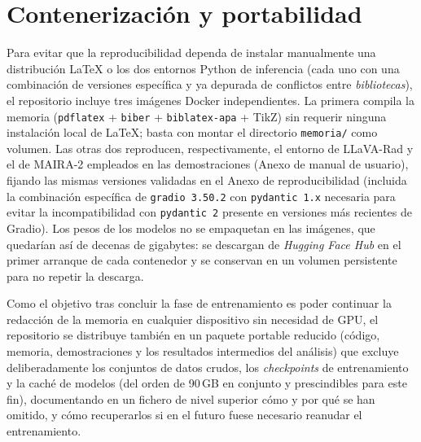 \documentclass[12pt,a4paper]{report}
\begin{document}
\section{Contenerización y portabilidad}
Para evitar que la reproducibilidad dependa de instalar manualmente una distribución LaTeX o los dos
entornos Python de inferencia (cada uno con una combinación de versiones específica y ya
depurada de conflictos entre \textit{bibliotecas}), el repositorio incluye tres imágenes
Docker independientes. La primera compila la memoria (\texttt{pdflatex} + \texttt{biber} +
\texttt{biblatex-apa} + TikZ) sin requerir ninguna instalación local de LaTeX; basta con montar el
directorio \texttt{memoria/} como volumen. Las otras dos reproducen, respectivamente, el entorno de
LLaVA-Rad y el de MAIRA-2 empleados en las demostraciones (Anexo de manual de usuario), fijando las
mismas versiones validadas en el Anexo de reproducibilidad (incluida la combinación específica
de \texttt{gradio~3.50.2} con \texttt{pydantic~1.x} necesaria para evitar la incompatibilidad con
\texttt{pydantic~2} presente en versiones más recientes de Gradio). Los pesos de los modelos no
se empaquetan en las imágenes, que quedarían así de decenas de gigabytes: se descargan de
\textit{Hugging Face Hub} en el primer arranque de cada contenedor y se conservan en un volumen
persistente para no repetir la descarga.

Como el objetivo tras concluir la fase de entrenamiento es poder continuar la redacción de la memoria
en cualquier dispositivo sin necesidad de GPU, el repositorio se distribuye también en un
paquete portable reducido (código, memoria, demostraciones y los resultados intermedios del
análisis) que excluye deliberadamente los conjuntos de datos crudos, los \textit{checkpoints} de
entrenamiento y la caché de modelos (del orden de 90\,GB en conjunto y prescindibles para este fin),
documentando en un fichero de nivel superior cómo y por qué se han omitido, y cómo recuperarlos si en
el futuro fuese necesario reanudar el entrenamiento.
\end{document}
